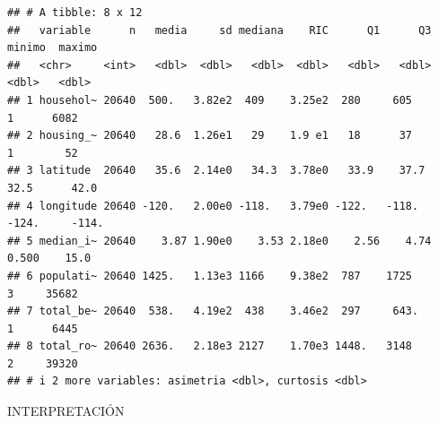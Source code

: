 \documentclass[
]{book}
\begin{document}
\begin{verbatim}
## # A tibble: 8 x 12
##   variable      n   media     sd mediana    RIC      Q1      Q3   minimo  maximo
##   <chr>     <int>   <dbl>  <dbl>   <dbl>  <dbl>   <dbl>   <dbl>    <dbl>   <dbl>
## 1 househol~ 20640  500.   3.82e2  409    3.25e2  280     605       1      6082  
## 2 housing_~ 20640   28.6  1.26e1   29    1.9 e1   18      37       1        52  
## 3 latitude  20640   35.6  2.14e0   34.3  3.78e0   33.9    37.7    32.5      42.0
## 4 longitude 20640 -120.   2.00e0 -118.   3.79e0 -122.   -118.   -124.     -114. 
## 5 median_i~ 20640    3.87 1.90e0    3.53 2.18e0    2.56    4.74    0.500    15.0
## 6 populati~ 20640 1425.   1.13e3 1166    9.38e2  787    1725       3     35682  
## 7 total_be~ 20640  538.   4.19e2  438    3.46e2  297     643.      1      6445  
## 8 total_ro~ 20640 2636.   2.18e3 2127    1.70e3 1448.   3148       2     39320  
## # i 2 more variables: asimetria <dbl>, curtosis <dbl>
\end{verbatim}

INTERPRETACIÓN
\end{document}
